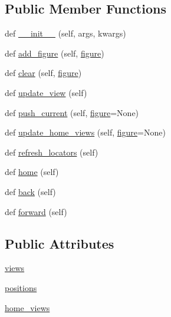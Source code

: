 \subsection*{Public Member Functions}
\begin{DoxyCompactItemize}
\item 
def \hyperlink{classmatplotlib_1_1backend__tools_1_1ToolViewsPositions_a7d7419bd88c3cd320a49de8e9157ea11}{\+\_\+\+\_\+init\+\_\+\+\_\+} (self, args, kwargs)
\item 
def \hyperlink{classmatplotlib_1_1backend__tools_1_1ToolViewsPositions_a3ae482485d950979fd992ea2bbb84822}{add\+\_\+figure} (self, \hyperlink{classmatplotlib_1_1backend__tools_1_1ToolBase_af85e83d1db0787aa40d06837204651ee}{figure})
\item 
def \hyperlink{classmatplotlib_1_1backend__tools_1_1ToolViewsPositions_a362502df7493ea169784ff2d594e58b8}{clear} (self, \hyperlink{classmatplotlib_1_1backend__tools_1_1ToolBase_af85e83d1db0787aa40d06837204651ee}{figure})
\item 
def \hyperlink{classmatplotlib_1_1backend__tools_1_1ToolViewsPositions_a3722e6f6fb2e023ee0887e506f368180}{update\+\_\+view} (self)
\item 
def \hyperlink{classmatplotlib_1_1backend__tools_1_1ToolViewsPositions_ae4651a7fc978f56e9162ca9bba6f68e6}{push\+\_\+current} (self, \hyperlink{classmatplotlib_1_1backend__tools_1_1ToolBase_af85e83d1db0787aa40d06837204651ee}{figure}=None)
\item 
def \hyperlink{classmatplotlib_1_1backend__tools_1_1ToolViewsPositions_a0c648f4a753fd1b1492b80a9dc28cfe4}{update\+\_\+home\+\_\+views} (self, \hyperlink{classmatplotlib_1_1backend__tools_1_1ToolBase_af85e83d1db0787aa40d06837204651ee}{figure}=None)
\item 
def \hyperlink{classmatplotlib_1_1backend__tools_1_1ToolViewsPositions_ae6a9b07f2ac6a835f5e0daa1045bd028}{refresh\+\_\+locators} (self)
\item 
def \hyperlink{classmatplotlib_1_1backend__tools_1_1ToolViewsPositions_a73c4a28765be8399ee477b2b121c6e2b}{home} (self)
\item 
def \hyperlink{classmatplotlib_1_1backend__tools_1_1ToolViewsPositions_a684d22dd5da2c37412a4b185f4e7895e}{back} (self)
\item 
def \hyperlink{classmatplotlib_1_1backend__tools_1_1ToolViewsPositions_a781ce34cd96aa8f415e922d0405e3ce8}{forward} (self)
\end{DoxyCompactItemize}
\subsection*{Public Attributes}
\begin{DoxyCompactItemize}
\item 
\hyperlink{classmatplotlib_1_1backend__tools_1_1ToolViewsPositions_a870b71f88ac37d2211aa4678cdd75c45}{views}
\item 
\hyperlink{classmatplotlib_1_1backend__tools_1_1ToolViewsPositions_a19a2ee7215c3ce9f542404fff1ca3f14}{positions}
\item 
\hyperlink{classmatplotlib_1_1backend__tools_1_1ToolViewsPositions_a2804c88a6165e1f3a2f1c83a7a37162c}{home\+\_\+views}
\end{DoxyCompactItemize}
